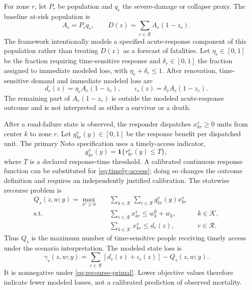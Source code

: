 For zone \(r\), let \(P_r\) be population and \(q_r\) the severe-damage or
collapse proxy. The baseline at-risk population is
\begin{equation}
  A_r=P_rq_r,
  \qquad
  D(z)=\sum_{r\in\mathcal R} A_r(1-z_r).
\label{eq:at-risk-population}
\end{equation}
The framework intentionally models a specified acute-response component of
this population rather than treating \(D(z)\) as a forecast of fatalities.
Let \(\eta_r\in[0,1]\) be the fraction requiring time-sensitive response and
\(\delta_r\in[0,1]\) the fraction assigned to immediate modeled loss, with
\(\eta_r+\delta_r\leq1\). After renovation, time-sensitive demand and
immediate modeled loss are
\begin{equation}
  d_r(z)=\eta_r A_r(1-z_r),
  \qquad
  \iota_r(z)=\delta_r A_r(1-z_r).
\label{eq:modeled-demand}
\end{equation}
The remaining part of \(A_r(1-z_r)\) is outside the modeled acute-response
outcome and is not interpreted as either a survivor or a death.

After a road-failure state is observed, the responder dispatches
\(x_{kr}^s\geq0\) units from center \(k\) to zone \(r\). Let
\(g_{kr}^s(y)\in[0,1]\) be the response benefit per dispatched unit. The
primary Noto specification uses a timely-access indicator,
\begin{equation}
 g_{kr}^s(y)=\mathbf{1}\{\tau_{kr}^s(y)\leq T\},
\label{eq:timely-access}
\end{equation}
where \(T\) is a declared response-time threshold. A calibrated continuous
response function can be substituted for \eqref{eq:timely-access}; doing so
changes the outcome definition and requires an independently justified
calibration. The statewise recourse problem is
\begin{align}
 Q_s(z,w;y)=\max_{x^s\geq0}\quad&
     \sum_{k\in\mathcal K}\sum_{r\in\mathcal R}
       g_{kr}^s(y)x_{kr}^s \label{eq:recourse-primal}\\
 \text{s.t.}\quad&
     \sum_{r\in\mathcal R}x_{kr}^s\leq w_k^0+w_k,
       &&k\in\mathcal K, \nonumber\\
 &   \sum_{k\in\mathcal K}x_{kr}^s\leq d_r(z),
       &&r\in\mathcal R. \nonumber
\end{align}
Thus \(Q_s\) is the maximum number of time-sensitive people receiving
timely access under the scenario interpretation. The modeled state loss is
\begin{equation}
 \gamma_s(z,w;y)
   =\sum_{r\in\mathcal R}\left[d_r(z)+\iota_r(z)\right]-Q_s(z,w;y).
\label{eq:state-loss}
\end{equation}
It is nonnegative under \eqref{eq:recourse-primal}. Lower objective values
therefore indicate fewer modeled losses, not a calibrated prediction of
observed mortality.

